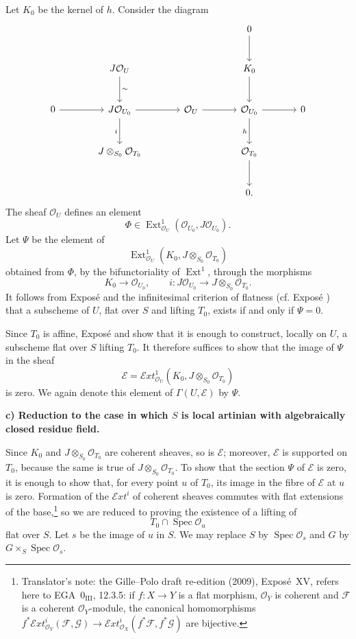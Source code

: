 Let \(K_0\) be the kernel of \(h\). Consider the diagram
\[
\begin{tikzcd}[column sep=large,row sep=large]
  &&& 0 \arrow[d] \\
  & J\mathcal O_U \arrow[d,"\sim"] && K_0 \arrow[d] \\
0 \arrow[r]
  & J\mathcal O_{U_0} \arrow[r] \arrow[d,"i"']
  & \mathcal O_U \arrow[r] & \mathcal O_{U_0}
      \arrow[r] \arrow[d,"h"'] & 0 \\
  & J\otimes_{S_0}\mathcal O_{T_0}
  && \mathcal O_{T_0} \arrow[d] \\
  &&& 0 .
\end{tikzcd}
\]
The sheaf \(\mathcal O_U\) defines an element
\[
  \Phi\in
  \operatorname{Ext}^{1}_{\mathcal O_U}
  (\mathcal O_{U_0},J\mathcal O_{U_0}).
\]
Let \(\Psi\) be the element of
\[
  \operatorname{Ext}^{1}_{\mathcal O_U}
  (K_0,J\otimes_{S_0}\mathcal O_{T_0})
\]
obtained from \(\Phi\), by the bifunctoriality of
\(\operatorname{Ext}^{1}\), through the morphisms
\[
  K_0\longrightarrow\mathcal O_{U_0},
  \qquad
  i:J\mathcal O_{U_0}
    \longrightarrow J\otimes_{S_0}\mathcal O_{T_0}.
\]
It follows from Exposé  and the infinitesimal criterion of
flatness (cf. Exposé ) that a subscheme of \(U\), flat over
\(S\) and lifting \(T_0\), exists if and only if \(\Psi=0\).

Since \(T_0\) is affine, Exposé  and  show that it is enough
to construct, locally on \(U\), a subscheme flat over \(S\) lifting
\(T_0\). It therefore suffices to show that the image of \(\Psi\) in
the sheaf
\[
  \mathscr E=
  \mathcal Ext^{1}_{\mathcal O_U}
  (K_0,J\otimes_{S_0}\mathcal O_{T_0})
\]
is zero. We again denote this element of
\(\Gamma(U,\mathscr E)\) by \(\Psi\).

\medskip\noindent\textbf{c) Reduction to the case in which \(S\) is
local artinian with algebraically closed residue field.}

Since \(K_0\) and \(J\otimes_{S_0}\mathcal O_{T_0}\) are coherent
sheaves, so is \(\mathscr E\); moreover, \(\mathscr E\) is supported
on \(T_0\), because the same is true of
\(J\otimes_{S_0}\mathcal O_{T_0}\). To show that the section \(\Psi\)
of \(\mathscr E\) is zero, it is enough to show that, for every point
\(u\) of \(T_0\), its image in the fibre of \(\mathscr E\) at \(u\)
is zero. Formation of the \(\mathcal Ext^i\) of coherent sheaves
commutes with flat extensions of the base,\footnote{Translator's note:
the Gille--Polo draft re-edition (2009), Exposé~XV, refers here to
EGA~\(0_{\mathrm{III}}\), 12.3.5: if \(f:X\to Y\) is a flat morphism,
\(\mathcal O_Y\) is coherent and \(\mathcal F\) is a coherent
\(\mathcal O_Y\)-module, the canonical homomorphisms
\(f^*\mathcal{E}xt^i_{\mathcal O_Y}(\mathcal F,\mathcal G)\to
\mathcal{E}xt^i_{\mathcal O_X}(f^*\mathcal F,f^*\mathcal G)\) are
bijective.} so we are reduced to proving the
existence of a lifting of
\[
  T_0\cap\operatorname{Spec}\mathcal O_u
\]
flat over \(S\). Let \(s\) be the image of \(u\) in \(S\). We may
replace \(S\) by \(\operatorname{Spec}\mathcal O_s\) and \(G\) by
\(G\times_S\operatorname{Spec}\mathcal O_s\).


